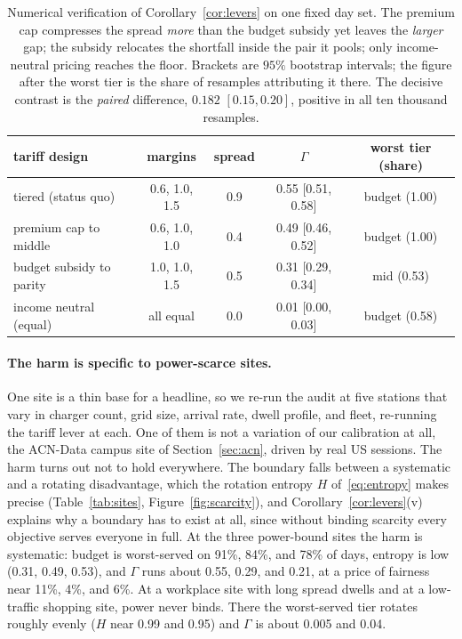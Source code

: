 \documentclass[manuscript, screen, review, anonymous]{acmart}
\begin{document}
\begin{table}[t]
\centering
\small
\setlength{\tabcolsep}{4pt}
\caption{Numerical verification of Corollary~\ref{cor:levers} on one fixed day set. The premium cap compresses the spread \emph{more} than the budget subsidy yet leaves the \emph{larger} gap; the subsidy relocates the shortfall inside the pair it pools; only income-neutral pricing reaches the floor. Brackets are $95\%$ bootstrap intervals; the figure after the worst tier is the share of resamples attributing it there. The decisive contrast is the \emph{paired} difference, $0.182$ $[0.15, 0.20]$, positive in all ten thousand resamples.}
\label{tab:tariff}
\begin{tabular}{lcccc}
\toprule
tariff design & margins & spread & $\Gamma$ & worst tier (share) \\
\midrule
tiered (status quo)      & 0.6, 1.0, 1.5 & 0.9 & 0.55 [0.51, 0.58] & budget (1.00) \\
premium cap to middle    & 0.6, 1.0, 1.0 & 0.4 & 0.49 [0.46, 0.52] & budget (1.00) \\
budget subsidy to parity & 1.0, 1.0, 1.5 & 0.5 & 0.31 [0.29, 0.34] & mid (0.53) \\
income neutral (equal)   & all equal     & 0.0 & 0.01 [0.00, 0.03] & budget (0.58) \\
\bottomrule
\end{tabular}
\end{table}

\paragraph{The harm is specific to power-scarce sites.}
One site is a thin base for a headline, so we re-run the audit at five stations that vary in charger count, grid size, arrival rate, dwell profile, and fleet, re-running the tariff lever at each. One of them is not a variation of our calibration at all, the ACN-Data campus site of Section~\ref{sec:acn}, driven by real US sessions. The harm turns out not to hold everywhere. The boundary falls between a systematic and a rotating disadvantage, which the rotation entropy $H$ of~\eqref{eq:entropy} makes precise (Table~\ref{tab:sites}, Figure~\ref{fig:scarcity}), and Corollary~\ref{cor:levers}(v) explains why a boundary has to exist at all, since without binding scarcity every objective serves everyone in full. At the three power-bound sites the harm is systematic: budget is worst-served on 91\%, 84\%, and 78\% of days, entropy is low (0.31, 0.49, 0.53), and $\Gamma$ runs about 0.55, 0.29, and 0.21, at a price of fairness near 11\%, 4\%, and 6\%. At a workplace site with long spread dwells and at a low-traffic shopping site, power never binds. There the worst-served tier rotates roughly evenly ($H$ near 0.99 and 0.95) and $\Gamma$ is about 0.005 and 0.04.
\end{document}
